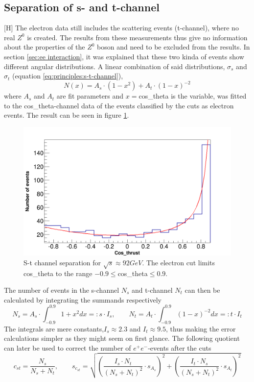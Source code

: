 \subsection{Separation of s- and t-channel}[H]
The electron data still includes the scattering events (t-channel), where no real $Z^0$ is created. The results from these measurements thus give no information about the properties of the $Z^0$ boson and need to be excluded from the results. In section \ref{sec:ee interaction}, it was explained that these two kinda of events show different angular distributions. A linear combination of said distributions, $\sigma_s$ and $\sigma_t$ (equation \ref{eq:principles:s-t-channel}),
\begin{equation}
N(x)=A_s\cdot(1-x^2)+A_t\cdot(1-x)^{-2}
\end{equation}
where $A_s$ and $A_t$ are fit parameters and $x=$cos\_theta is the variable, was fitted to the cos\_theta-channel data of the events classified by the cuts as electron events. The result can be seen in figure \ref{fig:stchannelseparation}.
\begin{figure}
\centering
\includegraphics[width=1.0\linewidth]{../results/data_results/cosp_fits/stchannelexample46.png}
\caption[s-t-channel separation $\sqrt{s}\approx\unit{92}{GeV}$ GeV]{S-t channel separation for $\sqrt{s}\approx\unit{92}{GeV}$. The electron cut limits cos\_theta to the range $-0.9\le$cos\_theta$\le0.9$.}
\label{fig:stchannelseparation}
\end{figure}
The number of events in the s-channel $N_s$ and t-channel $N_t$ can then be calculated by integrating the summands respectively
\begin{equation}
N_s=A_s\cdot\int_{-0.9}^{0.9}1+x^2dx=:s\cdot I_s,\qquad N_t=A_t\cdot\int_{-0.9}^{0.9}(1-x)^{-2}dx=:t\cdot I_t
\end{equation}
The integrals are mere constants,$I_s\approx2.3$ and $I_t\approx9.5$, thus making the error calculations simpler as they might seem on first glance. The following quotient can later be used to correct the number of $e^+e^-$-events after the cuts
\begin{equation}
c_{st}=\frac{N_s}{N_s+N_t},\qquad s_{c_{st}}=\sqrt{\left(\frac{I_s\cdot N_t}{(N_s+N_t)^2}\cdot s_{A_s}\right)^2+\left(\frac{I_t\cdot N_s}{(N_s+N_t)^2}\cdot s_{A_t}\right)^2}
\end{equation}

